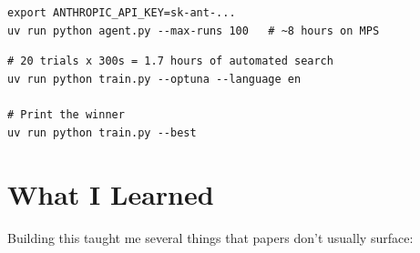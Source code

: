 \documentclass[12pt, a4paper]{article}
\begin{document}
\begin{tcolorbox}[codebox, title=Run the autonomous agent overnight]
\begin{lstlisting}[style=bashstyle]
export ANTHROPIC_API_KEY=sk-ant-...
uv run python agent.py --max-runs 100   # ~8 hours on MPS
\end{lstlisting}
\end{tcolorbox}

\begin{tcolorbox}[codebox, title=Run Bayesian HPO instead]
\begin{lstlisting}[style=bashstyle]
# 20 trials x 300s = 1.7 hours of automated search
uv run python train.py --optuna --language en

# Print the winner
uv run python train.py --best
\end{lstlisting}
\end{tcolorbox}

\section{What I Learned}

Building this taught me several things that papers don't usually surface:
\end{document}
